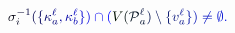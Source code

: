 \documentclass[12pt]{article}
\begin{document}
\makeatletter
\renewcommand*{\@textcolor}[3]{%
  \protect\leavevmode
  \begingroup
    \color#1{#2}#3%
  \endgroup
}
\makeatother
\begin{displaymath}
\mathcolor[RGB]{0,0,15}{\sigma} _ { \mathcolor[RGB]{0,0,30}{i} } ^ { \mathcolor[RGB]{0,0,45}{-} \mathcolor[RGB]{0,0,60}{1} } \mathcolor[RGB]{0,0,75}{(} \mathcolor[RGB]{0,0,90}{\{} \mathcolor[RGB]{0,0,105}{\kappa} _ { \mathcolor[RGB]{0,0,120}{a} } ^ { \mathcolor[RGB]{0,0,135}{\ell} } \mathcolor[RGB]{0,0,150}{,} \mathcolor[RGB]{0,0,165}{\kappa} _ { \mathcolor[RGB]{0,0,180}{b} } ^ { \mathcolor[RGB]{0,0,195}{\ell} } \mathcolor[RGB]{0,0,210}{\}} \mathcolor[RGB]{0,0,225}{)} \mathcolor[RGB]{0,0,240}{\cap} \mathcolor[RGB]{0,0,255}{(} \mathcolor[RGB]{0,15,0}{V} \mathcolor[RGB]{0,15,15}{(} \mathcal { \mathcolor[RGB]{0,15,30}{P} } _ { \mathcolor[RGB]{0,15,45}{a} } ^ { \mathcolor[RGB]{0,15,60}{\ell} } \mathcolor[RGB]{0,15,75}{)} \mathcolor[RGB]{0,15,90}{\setminus} \mathcolor[RGB]{0,15,105}{\{} \mathcolor[RGB]{0,15,120}{v} _ { \mathcolor[RGB]{0,15,135}{a} } ^ { \mathcolor[RGB]{0,15,150}{\ell} } \mathcolor[RGB]{0,15,165}{\}} \mathcolor[RGB]{0,15,180}{)} \mathcolor[RGB]{0,15,195}{\neq} \mathcolor[RGB]{0,15,210}{\emptyset} \mathcolor[RGB]{0,15,225}{.}
\end{displaymath}
\end{document}
